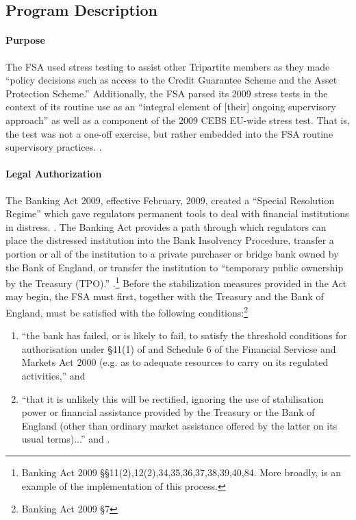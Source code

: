 \documentclass[12pt]{article}
\begin{document}
\subsection{Program Description}

\paragraph{Purpose} 

The FSA used stress testing to assist other Tripartite members as they made ``policy decisions such as access to the Credit Guarantee Scheme and the Asset Protection Scheme.'' Additionally, the FSA parsed its 2009 stress tests in the context of its routine use as an ``integral element of [their] ongoing supervisory approach'' as well as a component of the 2009 CEBS EU-wide stress test. That is, the test was not a one-off exercise, but rather embedded into the FSA routine supervisory practices. \citep{Results}.

\paragraph{Legal Authorization}

The Banking Act 2009, effective February, 2009, created a ``Special Resolution Regime'' which gave regulators permanent tools to deal with financial institutions in distress. \citep{BankingAct}. The Banking Act provides a path through which regulators can place the distressed institution into the Bank Insolvency Procedure, transfer a portion or all of the institution to a private purchaser or bridge bank owned by the Bank of England, or transfer the institution to ``temporary public ownership by the Treasury (TPO).'' \citep{DunfermlinePress}.\footnote{Banking Act 2009 \S \S 11(2),12(2),34,35,36,37,38,39,40,84. More broadly, \citet{Dunfermline} is an example of the implementation of this process. } Before the stabilization measures provided in the Act may begin, the FSA must first, together with the Treasury and the Bank of England, must be satisfied with the following conditions:\footnote{Banking Act 2009 \S 7}

\begin{enumerate}
\item ``the bank has failed, or is likely to fail, to satisfy the threshold conditions for authorisation under \S 41(1) of and Schedule 6 of the Financial Servicse and Markets Act 2000 (e.g. as to adequate resources to carry on its regulated activities,'' and 
\item ``that it is unlikely this will be rectified, ignoring the use of stabilisation power or financial assistance provided by the Treasury or the Bank of England (other than ordinary market assistance offered by the latter on its usual terms)...'' \citep{BankingAct} and \citep{McKnight}.
\end{enumerate}
\end{document}

